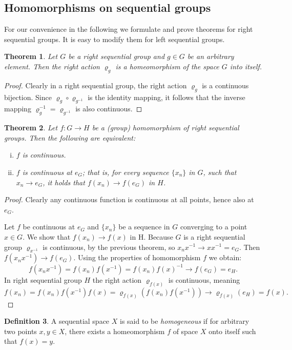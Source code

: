 \documentclass[12pt]{article}
\newtheorem{theorem}{Theorem}
\theoremstyle{definition}
\newtheorem{define}[theorem]{Definition}
\theoremstyle{remark}
\begin{document}
\subsection*{Homomorphisms on sequential groups}
For our convenience in the following we formulate and prove theorems for right sequential groups. It is easy to modify them for left sequential groups. 

\begin{theorem}\label{th:rahomeo}
Let $G$ be a right sequential group and $g\in G$ be an arbitrary element. Then the right action $\varrho_g$ is a homeomorphism of the space $G$ into itself.
\end{theorem}
\begin{proof}
Clearly in a right sequential group, the right action $\varrho_g$ is a continuous bijection. Since $\varrho_g\circ\varrho_{g^{-1}}$ is the identity mapping, it follows that the inverse mapping $\varrho_g^{-1}=\varrho_{g^{-1}}$ is also continuous.
\end{proof}

\begin{theorem}\label{th:contate}
Let $f: G\to H$ be a (group) homomorphism of right sequential groups.
Then the following are equivalent:
\begin{enumerate}[(i)]
	\item $f$ is continuous.
	\item $f$ is continuous at $e_G$; that is, for every sequence $\{x_n\}$ in $G$, such that $x_n\to e_G$, it holds that $f(x_n)\to f(e_G)$ in $H$.
\end{enumerate}
\end{theorem}
\begin{proof}
Clearly any continuous function is continuous at all points, hence also at $e_G$.

Let $f$ be continuous at $e_G$ and $\{x_n\}$ be a sequence in $G$ converging to a point $x\in G$. We show that $f(x_n)\to f(x)$ in H. Because $G$ is a right sequential group $\varrho_{x^{-1}}$ is continuous, by the previous theorem, so $x_nx^{-1}\to xx^{-1}=e_G$. Then $f(x_nx^{-1})\to f(e_G)$. Using the properties of homomorphism $f$ we obtain:
\[
	f(x_nx^{-1})=f(x_n)f(x^{-1})=f(x_n)f(x)^{-1}\to f(e_G) = e_H.
\]
In right sequential group $H$ the right action $\varrho_{f(x)}$ is continuous, meaning
\[
	f(x_n)=f(x_n)f(x^{-1})f(x)=\varrho_{f(x)}(f(x_n)f(x^{-1}))\to \varrho_{f(x)}(e_H)=f(x).
\]
\end{proof}

\begin{define}\label{def:homogen}
A sequential space $X$ is said to be \emph{homogeneous} if for arbitrary two points $x,y\in X$, there exists a homeomorphism $f$ of space $X$ onto itself such that $f(x)=y$. 
\end{define}
\end{document}

